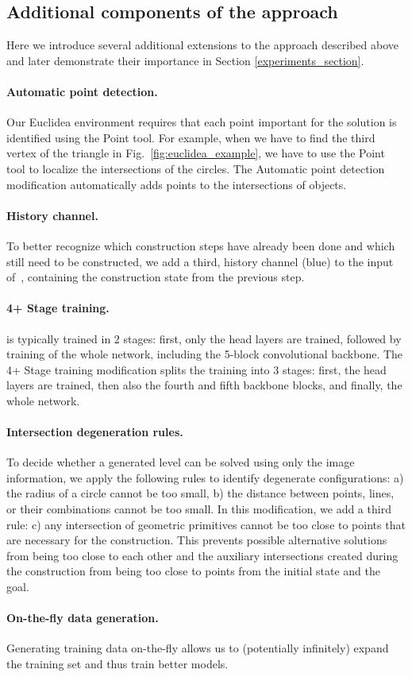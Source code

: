 \subsection{Additional components of the approach}
\label{mrcnn_components}
Here we introduce several additional extensions to the approach described above and later demonstrate their importance in Section \ref{experiments_section}.
\paragraph{\textbf{Automatic point detection.}}
Our Euclidea environment requires that each point important for the solution is identified using the Point tool.
For example, when we have to find the third vertex of the triangle in Fig.~\ref{fig:euclidea_example}, we have to use the Point tool to localize the intersections of the circles.
The Automatic point detection modification automatically adds points to the intersections of objects.
\paragraph{\textbf{History channel.}}
To better recognize which construction steps have already been done and which still need to be constructed, we add a third, history channel (blue) to the input of~\maskrcnn, containing the construction state from the previous step.
\paragraph{\textbf{4+ Stage training.}}
\maskrcnn is typically trained in 2 stages: first, only the head layers are trained, followed by training of the whole network, including the 5-block convolutional backbone.
The 4+ Stage training modification splits the training into 3 stages: first, the head layers are trained, then also the fourth and fifth backbone blocks, and finally, the whole network.
\paragraph{\textbf{Intersection degeneration rules.}}
To decide whether a generated level can be solved using only the image information, we apply the following rules to identify degenerate configurations: a) the radius of a circle cannot be too small, b) the distance between points, lines, or their combinations cannot be too small.
In this modification, we add a third rule: c) any intersection of geometric primitives cannot be too close to points that are necessary for the construction.
This prevents possible alternative solutions from being too close to each other and the auxiliary intersections created during the construction from being too close to points from the initial state and the goal.
\paragraph{\textbf{On-the-fly data generation.}}
Generating training data on-the-fly allows us to (potentially infinitely) expand the training set and thus train better models.

